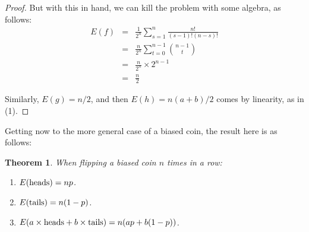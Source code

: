 \documentclass[12pt]{amsbook}
\newtheorem{theorem}{Theorem}[chapter]
\begin{document}
\begin{proof}
But with this in hand, we can kill the problem with some algebra, as follows:
\begin{eqnarray*}
E(f)
&=&\frac{1}{2^n}\sum_{s=1}^n\frac{n!}{(s-1)!(n-s)!}\\
&=&\frac{n}{2^n}\sum_{t=0}^{n-1}\binom{n-1}{t}\\
&=&\frac{n}{2^n}\times 2^{n-1}\\
&=&\frac{n}{2}
\end{eqnarray*}

Similarly, $E(g)=n/2$, and then $E(h)=n(a+b)/2$ comes by linearity, as in (1).
\end{proof}

Getting now to the more general case of a biased coin, the result here is as follows:


\begin{theorem}
When flipping a biased coin $n$ times in a row:
\begin{enumerate}
\item $E({\rm heads})=np$.

\item $E({\rm tails})=n(1-p)$.

\item $E(a\times{\rm heads}+b\times{\rm tails})=n(ap+b(1-p))$.
\end{enumerate} 
\end{theorem}
\end{document}
